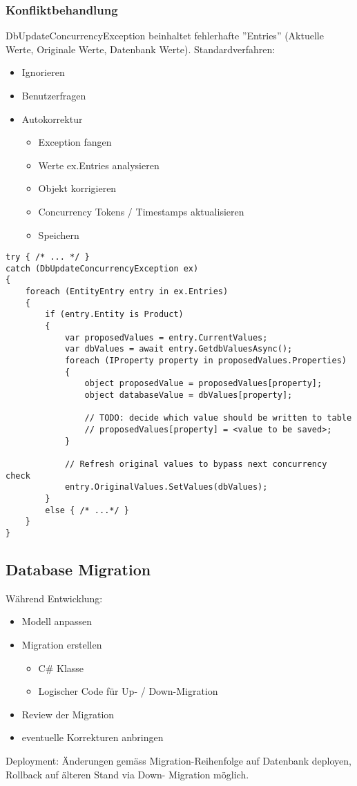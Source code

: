 \begin{multicols*}{2}
\subsubsection{Konfliktbehandlung}
DbUpdateConcurrencyException beinhaltet fehlerhafte ”Entries” (Aktuelle Werte, Originale Werte,
Datenbank Werte). 
Standardverfahren:
\begin{itemize}
    \item Ignorieren
    \item Benutzerfragen
    \item Autokorrektur
    \begin{itemize}
        \item Exception fangen
        \item Werte ex.Entries analysieren
        \item Objekt korrigieren
        \item Concurrency Tokens / Timestamps aktualisieren
        \item Speichern
    \end{itemize}
\end{itemize}
\begin{lstlisting}
try { /* ... */ }
catch (DbUpdateConcurrencyException ex) 
{
    foreach (EntityEntry entry in ex.Entries) 
    {
        if (entry.Entity is Product)
        {
            var proposedValues = entry.CurrentValues;
            var dbValues = await entry.GetdbValuesAsync();
            foreach (IProperty property in proposedValues.Properties) 
            {
                object proposedValue = proposedValues[property]; 
                object databaseValue = dbValues[property];
                
                // TODO: decide which value should be written to table
                // proposedValues[property] = <value to be saved>;
            }

            // Refresh original values to bypass next concurrency check
            entry.OriginalValues.SetValues(dbValues); 
        }
        else { /* ...*/ } 
    }
}
\end{lstlisting}

\subsection{Database Migration}
Während Entwicklung: 
\begin{itemize}
    \item Modell anpassen
    \item Migration erstellen
    \begin{itemize}
        \item C\# Klasse
        \item Logischer Code für Up- / Down-Migration
    \end{itemize}
    \item Review der Migration
    \item eventuelle Korrekturen anbringen
\end{itemize} 
Deployment: Änderungen gemäss Migration-Reihenfolge auf Datenbank deployen, Rollback auf älteren Stand via Down-
Migration möglich.

\end{multicols*}
